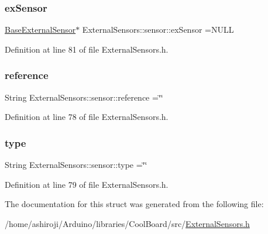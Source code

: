 \subsubsection{\texorpdfstring{ex\+Sensor}{exSensor}}
{\footnotesize\ttfamily \hyperlink{class_base_external_sensor}{Base\+External\+Sensor}$\ast$ External\+Sensors\+::sensor\+::ex\+Sensor =N\+U\+LL}



Definition at line 81 of file External\+Sensors.\+h.

\mbox{\label{struct_external_sensors_1_1sensor_afed5bdfd49732202a368b600cb8396fe}} 
\subsubsection{\texorpdfstring{reference}{reference}}
{\footnotesize\ttfamily String External\+Sensors\+::sensor\+::reference =\char`\"{}\char`\"{}}



Definition at line 78 of file External\+Sensors.\+h.

\mbox{\label{struct_external_sensors_1_1sensor_a6acfdb02c742c2110d7bd2b5d9fce9e7}} 
\subsubsection{\texorpdfstring{type}{type}}
{\footnotesize\ttfamily String External\+Sensors\+::sensor\+::type =\char`\"{}\char`\"{}}



Definition at line 79 of file External\+Sensors.\+h.



The documentation for this struct was generated from the following file\+:\begin{DoxyCompactItemize}
\item 
/home/ashiroji/\+Arduino/libraries/\+Cool\+Board/src/\hyperlink{_external_sensors_8h}{External\+Sensors.\+h}\end{DoxyCompactItemize}

